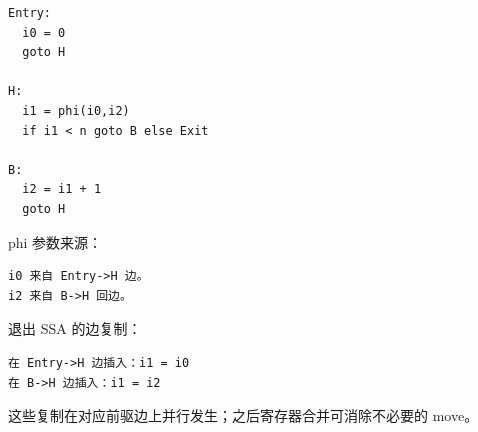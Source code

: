 \documentclass[UTF8]{ctexart}
\begin{document}
\begin{Verbatim}[fontsize=\small,breaklines=true]
Entry:
  i0 = 0
  goto H

H:
  i1 = phi(i0,i2)
  if i1 < n goto B else Exit

B:
  i2 = i1 + 1
  goto H
\end{Verbatim}

phi 参数来源：

\begin{Verbatim}[fontsize=\small,breaklines=true]
i0 来自 Entry->H 边。
i2 来自 B->H 回边。
\end{Verbatim}

退出 SSA 的边复制：

\begin{Verbatim}[fontsize=\small,breaklines=true]
在 Entry->H 边插入：i1 = i0
在 B->H 边插入：i1 = i2
\end{Verbatim}

这些复制在对应前驱边上并行发生；之后寄存器合并可消除不必要的 move。
\end{document}
